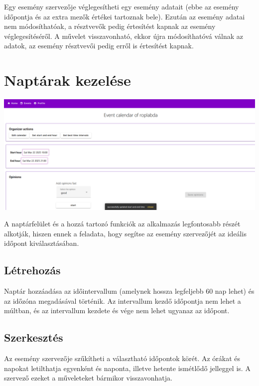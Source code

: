 \documentclass[a4paper,12pt]{report}
\theoremstyle{definition}
\theoremstyle{remark}
\begin{document}
Egy esemény szervezője véglegesítheti egy esemény adatait (ebbe az esemény időpontja és az extra mezők értékei tartoznak bele).  Ezután az esemény adatai nem módosíthatóak, a résztvevők pedig értesítést kapnak az esemény véglegesítéséről. A művelet visszavonható, ekkor újra módosíthatóvá válnak az adatok, az esemény résztvevői pedig erről is értesítést kapnak.

\section{Naptárak kezelése}

\begin{center}
\includegraphics[width=150mm]{calendar_editor}
\captionsetup{width=0.8\linewidth}
\end{center}

A naptárfelület és a hozzá tartozó funkciók az alkalmazás legfontosabb részét alkotják, hiszen ennek a feladata, hogy segítse az esemény szervezőjét az ideális időpont kiválasztásában.

	\subsection{Létrehozás}

Naptár hozzáadása az időintervallum (amelynek hossza legfeljebb 60 nap lehet) és az időzóna megadásával történik. Az intervallum kezdő időpontja nem lehet a múltban, és az intervallum kezdete és vége nem lehet ugyanaz az időpont.

	\subsection{Szerkesztés}

Az esemény szervezője szűkítheti a választható időpontok körét. Az órákat és napokat letilthatja egyenként és naponta, illetve hetente ismétlődő jelleggel is. A szervező ezeket a műveleteket bármikor visszavonhatja.
\end{document}

